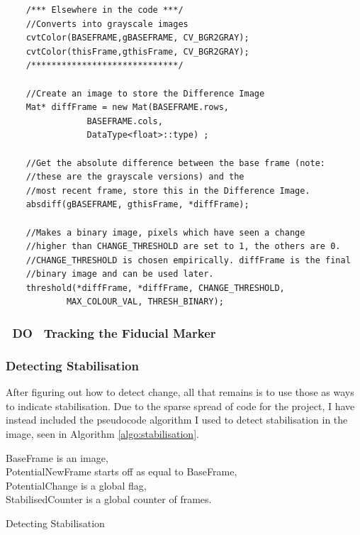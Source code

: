 \documentclass[11pt]{article}
\begin{document}
\begin{lstlisting}
	/*** Elsewhere in the code ***/
	//Converts into grayscale images
	cvtColor(BASEFRAME,gBASEFRAME, CV_BGR2GRAY);
	cvtColor(thisFrame,gthisFrame, CV_BGR2GRAY);
	/*****************************/

	//Create an image to store the Difference Image
  	Mat* diffFrame = new Mat(BASEFRAME.rows, 
  				BASEFRAME.cols,
  				DataType<float>::type) ;
	
	//Get the absolute difference between the base frame (note:
	//these are the grayscale versions) and the 
	//most recent frame, store this in the Difference Image.  				
  	absdiff(gBASEFRAME, gthisFrame, *diffFrame);	
  	
  	//Makes a binary image, pixels which have seen a change
  	//higher than CHANGE_THRESHOLD are set to 1, the others are 0.
  	//CHANGE_THRESHOLD is chosen empirically. diffFrame is the final
  	//binary image and can be used later.
  	threshold(*diffFrame, *diffFrame, CHANGE_THRESHOLD, 
  			MAX_COLOUR_VAL, THRESH_BINARY);
\end{lstlisting}

\subsubsection{~DO~ Tracking the Fiducial Marker}

\subsubsection{Detecting Stabilisation}
After figuring out how to detect change, all that remains is to use those
as ways to indicate stabilisation. Due to the sparse spread of code
for the project, I have instead included the pseudocode algorithm I 
used to detect stabilisation in the image, seen in 
Algorithm \ref{algo:stabilisation}. 

\begin{algorithm}
\DontPrintSemicolon
BaseFrame is an image,\\
PotentialNewFrame starts off as equal to BaseFrame,\\
PotentialChange is a global flag,\\
StabilisedCounter is a global counter of frames.

\caption{Detecting Stabilisation}
\label{algo:stabilisation}
\end{algorithm}
\end{document}
